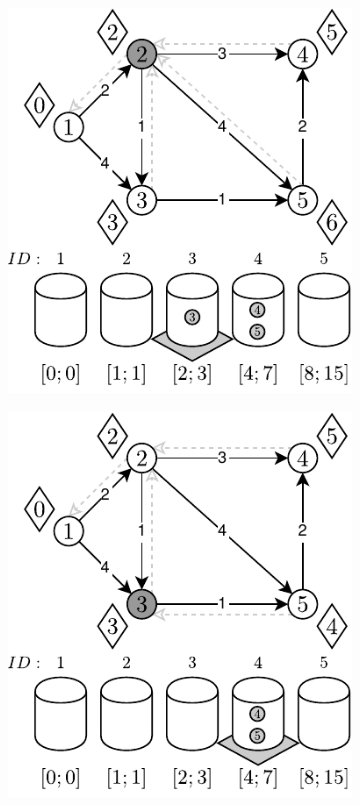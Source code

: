 \begin{figure}[!htbp]
\begin{subfigure}[b]{0.3\textwidth}
		\caption{}
	\end{subfigure}
	\begin{subfigure}[b]{0.3\textwidth}
		\includegraphics[width=\textwidth]{Chapter_II/7/c.pdf}
		\caption{}
	\end{subfigure}
	\begin{subfigure}[b]{0.3\textwidth}
		\includegraphics[width=\textwidth]{Chapter_II/7/d.pdf}

\end{subfigure}
\end{figure}
